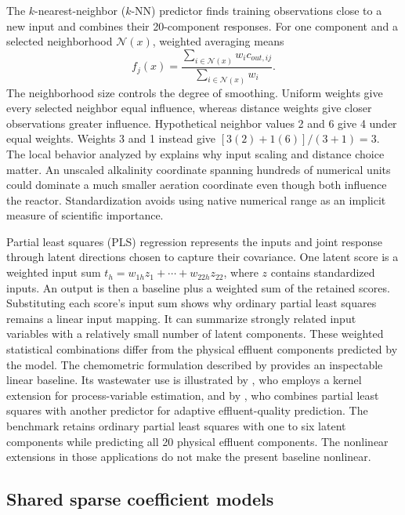 The $k$-nearest-neighbor ($k$-NN) predictor finds training observations close to a new input and combines their 20-component responses. For one component and a selected neighborhood $\mathcal N(x)$, weighted averaging means
\[
f_j(x)=\frac{\sum_{i\in\mathcal N(x)}w_i c_{out,ij}}{\sum_{i\in\mathcal N(x)}w_i}.
\]
The neighborhood size controls the degree of smoothing. Uniform weights give every selected neighbor equal influence, whereas distance weights give closer observations greater influence. Hypothetical neighbor values 2 and 6 give 4 under equal weights. Weights 3 and 1 instead give $[3(2)+1(6)]/(3+1)=3$. The local behavior analyzed by \citet{Mack1981} explains why input scaling and distance choice matter. An unscaled alkalinity coordinate spanning hundreds of numerical units could dominate a much smaller aeration coordinate even though both influence the reactor. Standardization avoids using native numerical range as an implicit measure of scientific importance.

Partial least squares (PLS) regression represents the inputs and joint response through latent directions chosen to capture their covariance. One latent score is a weighted input sum $t_h=w_{1h}z_1+\cdots+w_{22h}z_{22}$, where $z$ contains standardized inputs. An output is then a baseline plus a weighted sum of the retained scores. Substituting each score's input sum shows why ordinary partial least squares remains a linear input mapping. It can summarize strongly related input variables with a relatively small number of latent components. These weighted statistical combinations differ from the physical effluent components predicted by the model. The chemometric formulation described by \citet{Wold2001} provides an inspectable linear baseline. Its wastewater use is illustrated by \citet{Woo2009}, who employs a kernel extension for process-variable estimation, and by \citet{Yang2021}, who combines partial least squares with another predictor for adaptive effluent-quality prediction. The benchmark retains ordinary partial least squares with one to six latent components while predicting all 20 physical effluent components. The nonlinear extensions in those applications do not make the present baseline nonlinear.

\subsection{Shared sparse coefficient models}

